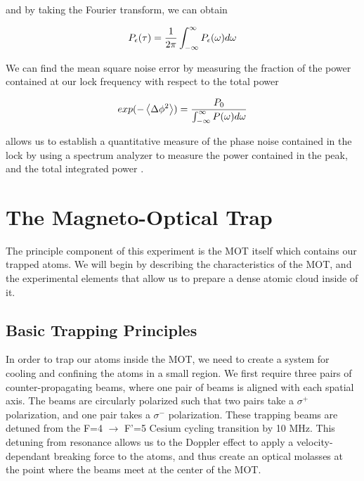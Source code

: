 \noindent
and by taking the Fourier transform, we can obtain

\begin{equation}
  \label{eq:pll_pow}
  P_\epsilon(\tau) = \frac{1}{2\pi} \int^\infty_{-\infty} P_\epsilon (\omega ) d \omega  
\end{equation}

\noindent
We can find the mean square noise error by measuring the fraction of the power contained at our lock frequency with respect to the total power

\begin{equation}
  \label{eq:pll_rms}
  exp(-\left< \Delta \phi^2 \right>) = \frac{P_0}{\int^\infty_{-\infty} P(\omega ) d \omega } 
\end{equation}

\noindent
{} allows us to establish a quantitative measure of the phase
noise contained in the lock by using a spectrum analyzer to measure the power contained in the peak, and
the total integrated power \cite{appel2009versatile}.



\section{The Magneto-Optical Trap}

The principle component of this experiment is the MOT itself which contains
our trapped atoms.  We will begin by describing the characteristics of the
MOT, and the experimental elements that allow us to prepare a dense atomic
cloud inside of it.

\subsection{Basic Trapping Principles} 

In order to trap our atoms inside the MOT, we need to create a system for
cooling and confining the atoms in a small region.  We first require three
pairs of counter-propagating beams, where one pair of beams is aligned with each
spatial axis.  The beams are circularly polarized such that two pairs take a
$\sigma^+$ polarization, and one pair takes a $\sigma^-$ polarization. These
trapping beams are detuned from the F=4 $\to$ F'=5 Cesium cycling transition by
10 MHz.  This detuning from resonance allows us to the Doppler effect to apply a velocity-dependant breaking force to the atoms, and thus create an optical molasses at the point where the beams meet at the center of the MOT.


